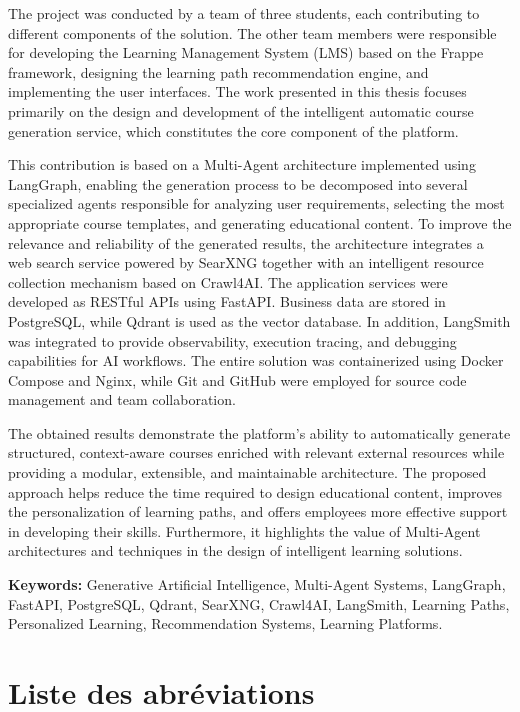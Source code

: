 \documentclass[12pt,a4paper,oneside]{report}
\begin{document}
The project was conducted by a team of three students, each contributing to different components of the solution. The other team members were responsible for developing the Learning Management System (LMS) based on the Frappe framework, designing the learning path recommendation engine, and implementing the user interfaces. The work presented in this thesis focuses primarily on the design and development of the intelligent automatic course generation service, which constitutes the core component of the platform.

This contribution is based on a Multi-Agent architecture implemented using LangGraph, enabling the generation process to be decomposed into several specialized agents responsible for analyzing user requirements, selecting the most appropriate course templates, and generating educational content. To improve the relevance and reliability of the generated results, the architecture integrates a web search service powered by SearXNG together with an intelligent resource collection mechanism based on Crawl4AI. The application services were developed as RESTful APIs using FastAPI. Business data are stored in PostgreSQL, while Qdrant is used as the vector database. In addition, LangSmith was integrated to provide observability, execution tracing, and debugging capabilities for AI workflows. The entire solution was containerized using Docker Compose and Nginx, while Git and GitHub were employed for source code management and team collaboration.

The obtained results demonstrate the platform's ability to automatically generate structured, context-aware courses enriched with relevant external resources while providing a modular, extensible, and maintainable architecture. The proposed approach helps reduce the time required to design educational content, improves the personalization of learning paths, and offers employees more effective support in developing their skills. Furthermore, it highlights the value of Multi-Agent architectures and techniques in the design of intelligent learning solutions.

\textbf{Keywords:} Generative Artificial Intelligence, Multi-Agent Systems, LangGraph, FastAPI, PostgreSQL, Qdrant, SearXNG, Crawl4AI, LangSmith, Learning Paths, Personalized Learning, Recommendation Systems, Learning Platforms.

\chapter*{Liste des abréviations}
\end{document}
